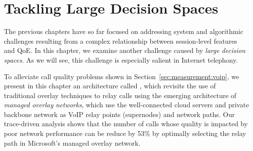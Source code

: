 \chapter{Tackling Large Decision Spaces}
\label{ch:via}



\providecommand{\ControlPlane}{{video optimization system}\xspace}
\providecommand{\mdn}{{MDN}\xspace}
\providecommand{\managed}{{managed overlay network}\xspace}
\providecommand{\Managed}{{Managed overlay network}\xspace}
\providecommand{\voip}{{audio conference application}\xspace}
\providecommand{\Voip}{{Audio conference application}\xspace}


\providecommand{\skype}{{Skype}\xspace}
\providecommand{\azure}{{ABC}\xspace}
\providecommand{\direct}{{default}\xspace}
\providecommand{\option}{{relaying option}\xspace}
\providecommand{\options}{{relaying options}\xspace}


The previous chapters have so far focused on addressing system and 
algorithmic challenges resulting from a complex relationship between 
session-level features and QoE.
In this chapter, we examine another
challenge caused by {\em large decision spaces}.
As we will see, this challenge is especially salient in Internet telephony.

To alleviate call quality problems shown in Section~\ref{sec:measurement:voip},
we present in this chapter an architecture called {\em \hybrid}, which revisits the 
use of traditional overlay techniques to relay calls using the emerging architecture 
of {\em managed overlay networks}, which use the well-connected cloud servers
and private backbone network as VoIP relay points (supernodes) and network paths. 
Our trace-driven analysis shows that the number of calls whose quality is impacted 
by poor network performance can be reduce by 53\% by optimally selecting the 
relay path in Microsoft's managed overlay network.

